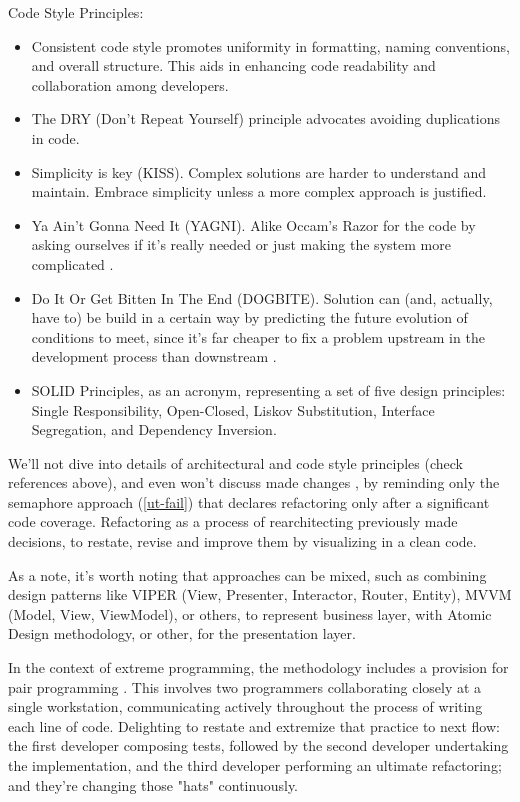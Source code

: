 \noindent Code Style Principles:

\begin{itemize}
  \item Consistent code style \cite{Mart22} promotes uniformity in formatting, naming conventions, and overall structure. 
  This aids in enhancing code readability and collaboration among developers.

  \item The DRY (Don't Repeat Yourself) principle advocates avoiding duplications in code.

  \item Simplicity is key (KISS). Complex solutions are harder to understand and maintain. Embrace simplicity unless a 
  more complex approach is justified.

  \item Ya Ain't Gonna Need It (YAGNI). Alike Occam's Razor for the code by asking ourselves if it's really needed or 
  just making the system more complicated \cite{LaiJ23}.

  \item Do It Or Get Bitten In The End (DOGBITE). Solution can (and, actually, have to) be build in a certain way 
  by predicting the future evolution of conditions to meet, since it's far cheaper to fix a problem upstream in the 
  development process than downstream \cite{McCo97}.

  \item SOLID Principles, as an acronym, representing a set of five design principles: Single Responsibility, 
  Open-Closed, Liskov Substitution, Interface Segregation, and Dependency Inversion.
\end{itemize}

\noindent We'll not dive into details of architectural and code style principles (check references above), and even 
won't discuss made changes  , by reminding only the semaphore approach (\ref{ut-fail}) that 
declares refactoring only after a significant code coverage. Refactoring as a process of rearchitecting \cite{Chec23} 
previously made decisions, to restate, revise and improve them by visualizing in a clean code. 

As a note, it's worth noting that approaches can be mixed, such as combining design patterns like VIPER (View, 
Presenter, Interactor, Router, Entity), MVVM (Model, View, ViewModel), or others, to represent business layer, with 
Atomic Design \cite{Kama22} methodology, or other, for the presentation layer.

In the context of extreme programming, the methodology includes a provision for pair programming \cite{Ligu19}. This 
involves two programmers collaborating closely at a single workstation, communicating actively throughout the process 
of writing each line of code. Delighting to restate and extremize that practice to next flow: the first developer 
composing tests, followed by the second developer undertaking the implementation, and the third developer 
performing an ultimate refactoring; and they're changing those "hats" \cite{Bono17} continuously.
